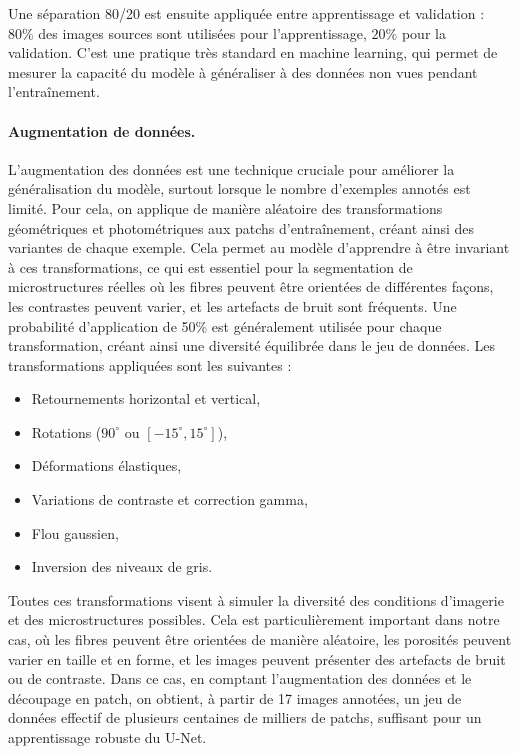 \documentclass[a4paper,11pt]{article}
\begin{document}
Une séparation 80/20 est ensuite appliquée entre apprentissage et validation : $80\%$ des images sources sont utilisées pour l'apprentissage, $20\%$ pour la validation. C'est une pratique très standard en machine learning, qui permet de mesurer la capacité du modèle à généraliser à des données non vues pendant l'entraînement.

\paragraph{Augmentation de données.}

L'augmentation des données est une technique cruciale pour améliorer la généralisation du modèle, surtout lorsque le nombre d'exemples annotés est limité. Pour cela, on applique de manière aléatoire des transformations géométriques et photométriques aux patchs d'entraînement, créant ainsi des variantes de chaque exemple. Cela permet au modèle d'apprendre à être invariant à ces transformations, ce qui est essentiel pour la segmentation de microstructures réelles où les fibres peuvent être orientées de différentes façons, les contrastes peuvent varier, et les artefacts de bruit sont fréquents. Une probabilité d'application de 50\% est généralement utilisée pour chaque transformation, créant ainsi une diversité équilibrée dans le jeu de données. Les transformations appliquées sont les suivantes :

\begin{itemize}
    \item Retournements horizontal et vertical,
    \item Rotations ($90^\circ$ ou $[-15^\circ, 15^\circ]$),
    \item Déformations élastiques,
    \item Variations de contraste et correction gamma,
    \item Flou gaussien,
    \item Inversion des niveaux de gris.
\end{itemize}

\vspace{0.1cm}
Toutes ces transformations visent à simuler la diversité des conditions d'imagerie et des microstructures possibles. Cela est particulièrement important dans notre cas, où les fibres peuvent être orientées de manière aléatoire, les porosités peuvent varier en taille et en forme, et les images peuvent présenter des artefacts de bruit ou de contraste. Dans ce cas, en comptant l'augmentation des données et le découpage en patch, on obtient, à partir de 17 images annotées, un jeu de données effectif de plusieurs centaines de milliers de patchs, suffisant pour un apprentissage robuste du U-Net.
\end{document}
